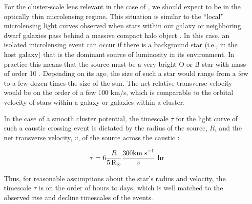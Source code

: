 For the cluster-scale lens relevant in the case of \spock, we should
expect to be in the optically thin microlensing regime.  This
situation is similar to the ``local'' microlensing light curves
observed when stars within our galaxy or neighboring dwarf galaxies
pass behind a massive compact halo object \citep{Paczynski:1986,
  Alcock:1993, Aubourg:1993, Udalski:1993}.  In this case, an isolated
microlensing event can occur if there is a background star (i.e., in
the \spock host galaxy) that is the dominant source of luminosity in
its environment. In practice this means that the source must be a very
bright O or B star with mass of order 10 \Msun.  Depending on its age,
the size of such a star would range from a few to a few dozen times
the size of the sun.  The net relative transverse velocity would be on
the order of a few 100 km/s, which is comparable to the orbital
velocity of stars within a galaxy or galaxies within a cluster.

In the case of a smooth cluster potential, the timescale $\tau$ for
the light curve of such a caustic crossing event is dictated by the
radius of the source, $R$, and the net transverse velocity, $v$, of
the source across the caustic
\citet{Chang:1979,Chang:1984,MiraldaEscude:1991}:

\begin{equation}
  \tau = 6\frac{R}{5\,\mbox{R$_{\odot}$}}\frac{300 {\rm km~ s}^{-1}}{v}~\rm{hr}
\label{eqn:caustic_crossing_time}
\end{equation}

\noindent Thus, for reasonable assumptions about the star's radius and
velocity, the timescale $\tau$ is on the order of hours to days, which is well
matched to the observed rise and decline timescales of the \spock
events.


